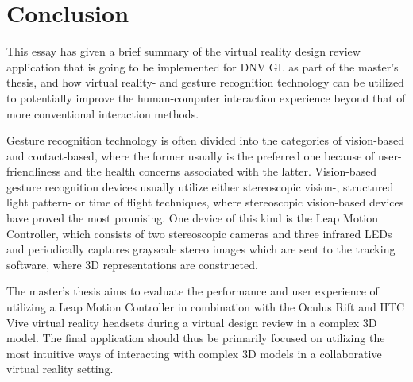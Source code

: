 \chapter{Conclusion}
This essay has given a brief summary of the virtual reality design review application that is going to be implemented for DNV GL as part of the master's thesis, and how virtual reality- and gesture recognition technology can be utilized to potentially improve the human-computer interaction experience beyond that of more conventional interaction methods. 

Gesture recognition technology is often divided into the categories of vision-based and contact-based, where the former usually is the preferred one because of user-friendliness and the health concerns associated with the latter. Vision-based gesture recognition devices usually utilize either stereoscopic vision-, structured light pattern- or time of flight techniques, where stereoscopic vision-based devices have proved the most promising. One device of this kind is the Leap Motion Controller, which consists of two stereoscopic cameras and three infrared LEDs and periodically captures grayscale stereo images which are sent to the tracking software, where 3D representations are constructed. 

The master's thesis aims to evaluate the performance and user experience of utilizing a Leap Motion Controller in combination with the Oculus Rift and HTC Vive virtual reality headsets during a virtual design review in a complex 3D model. The final application should thus be primarily focused on utilizing the most intuitive ways of interacting with complex 3D models in a collaborative virtual reality setting.     	                                     



